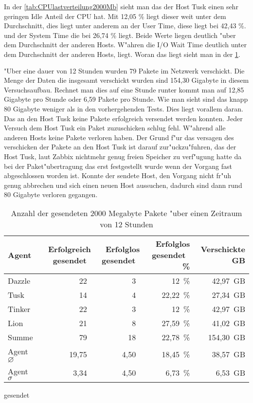 In der \cref{tab:CPUlastverteilung2000Mb} sieht man das der Host Tusk einen sehr geringen Idle Anteil der CPU hat. %
Mit 12,05 \% liegt dieser weit unter dem Durchschnitt, dies liegt unter anderem an der User Time, diese liegt bei 42,43 \%. %
und der System Time die bei 26,74 \% liegt. Beide Werte liegen deutlich "uber dem Durchschnitt der anderen Hosts. %
W"ahren die I/O Wait Time deutlich unter dem Durchschnitt der anderen Hosts, liegt. Woran das liegt sieht man %
in der \cref{tab:VerschickteDaten2000Mb}. 


"Uber eine dauer von 12 Stunden wurden 79 Pakete im Netzwerk verschickt. Die Menge der Daten die insgesamt verschickt wurden sind 154,30 Gigabyte in diesem Versuchsaufbau. %
Rechnet man dies auf eine Stunde runter kommt man auf 12,85 Gigabyte pro Stunde oder 6,59 Pakete pro Stunde. Wie man sieht sind das %
knapp 80 Gigabyte weniger als in den vorhergehenden Tests. Dies liegt vorallem daran. Das an den Host Tusk keine Pakete erfolgreich versendet %
werden konnten. Jeder Versuch dem Host Tusk ein Paket zuzuschicken schlug fehl. W"ahrend alle anderen Hosts keine Pakete verloren haben. %
Der Grund f"ur das versagen des verschicken der Pakete an den Host Tusk ist darauf zur"uckzu"fuhren, das der Host Tusk, laut Zabbix %
nichtmehr genug freien Speicher zu verf"ugung hatte da bei der Paket"ubertragung das erst festgestellt wurde wenn der Vorgang fast %
abgeschlossen worden ist. Konnte der sendete Host, den Vorgang nicht fr"uh genug abbrechen und sich einen neuen Host aussuchen, %
dadurch sind dann rund 80 Gigabyte verloren gegangen. %

\begin{table}
\centering
\begin{tabular}{l%
 r<{\,}%
 r<{\,}%
 r<{\,\%}%
 r<{\,GB}%
}
Agent  				& Erfolgreich gesendet			& Erfolglos gesendet			& Erfolglos gesendet	& Verschickte	\\
\hline
Dazzle 				& 22  			 		& 3  					& 12			& 42,97			\\
Tusk 				& 14  					& 4  					& 22,22			& 27,34			\\
Tinker				& 22  					& 3  					& 12			& 42,97			\\
Lion				& 21  					& 8  					& 27,59			& 41,02			\\ 
Summe				& 79  					& 18  					& 22,78			& 154,30		\\
Agent $\diameter $  		& 19,75					& 4,50				 	& 18,45			& 38,57 		\\   
Agent $\sigma $			& 3,34		 			& 4,50					& 6,73    		& 6,53		\\
\end{tabular}
gesendet\caption{Anzahl der gesendeten 2000 Megabyte Pakete "uber einen Zeitraum von 12 Stunden}
\label{tab:VerschickteDaten2000Mb}
\end{table}

